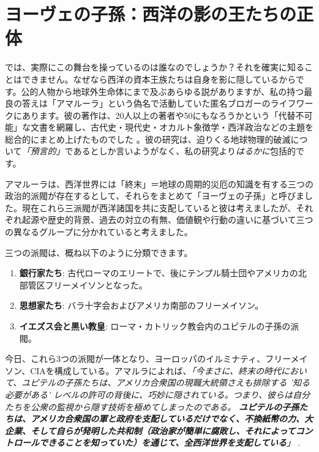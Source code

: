 \documentclass[10pt,twocolumn,letterpaper]{article}
\begin{document}
\section{ヨーヴェの子孫：西洋の影の王たちの正体}

では、実際にこの舞台を操っているのは誰なのでしょうか？それを確実に知ることはできません。なぜなら西洋の資本王族たちは自身を影に隠しているからです。公的人物から地球外生命体にまで及ぶあらゆる説がありますが、私の持つ最良の答えは「アマルーラ」という偽名で活動していた匿名ブロガーのライフワークにあります。彼の著作は、20人以上の著者や50にもなろうかという「代替不可能」な文書を網羅し、古代史・現代史・オカルト象徴学・西洋政治などの主題を総合的にまとめ上げたものでした \cite{33,34}。彼の研究は、迫りくる地球物理的破滅について\textit{「預言的」}であるとしか言いようがなく、私の研究より\textit{はるかに}包括的です。

アマルーラは、西洋世界には「終末」＝地球の周期的災厄の知識を有する三つの政治的派閥が存在するとして、それらをまとめて「ヨーヴェの子孫」と呼びました。現在これら三派閥が西洋諸国を共に支配していると彼は考えましたが、それぞれ起源や歴史的背景、過去の対立の有無、価値観や行動の違いに基づいて三つの異なるグループに分かれていると考えました。

三つの派閥は、概ね以下のように分類できます。

\begin{flushleft}
\begin{enumerate}
    \item \textbf{銀行家たち}: 古代ローマのエリートで、後にテンプル騎士団やアメリカの北部管区フリーメイソンとなった。
    \item \textbf{思想家たち}: バラ十字会およびアメリカ南部のフリーメイソン。
    \item \textbf{イエズス会と黒い教皇}: ローマ・カトリック教会内のユピテルの子孫の派閥。
\end{enumerate}
\end{flushleft}

今日、これら3つの派閥が一体となり、ヨーロッパのイルミナティ、フリーメイソン、CIAを構成している。アマルラによれば、\textit{「今まさに、終末の時代において、ユピテルの子孫たちは、アメリカ合衆国の現職大統領さえも排除する '知る必要がある' レベルの許可の背後に、巧妙に隠されている。つまり、彼らは自分たちを公衆の監視から隠す技術を極めてしまったのである。 \textbf{ユピテルの子孫たちは、アメリカ合衆国の軍と政府を支配しているだけでなく、不換紙幣の力、大企業、そして自らが発明した共和制（政治家が簡単に腐敗し、それによってコントロールできることを知っていた）を通じて、全西洋世界を支配している}」} \cite{33,34}.
\end{document}
